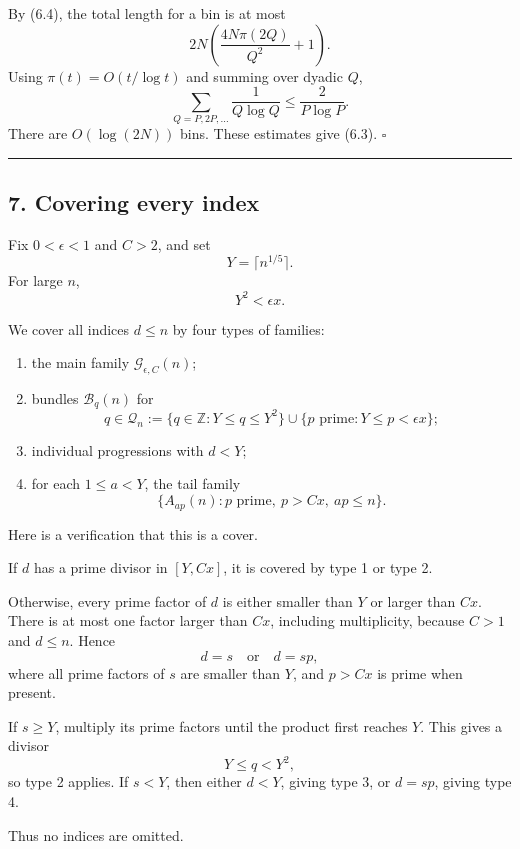 \documentclass[
  11pt,
  a4paper,
]{article}
\providecommand{\tightlist}{%
  \setlength{\itemsep}{0pt}\setlength{\parskip}{0pt}}
\begin{document}
By (6.4), the total length for a bin is at most \[
2N\left(\frac{4N\pi(2Q)}{Q^2}+1\right).
\] Using \(\pi(t)=O(t/\log t)\) and summing over dyadic \(Q\), \[
\sum_{Q=P,2P,\ldots}\frac1{Q\log Q}
\le \frac2{P\log P}.
\] There are \(O(\log(2N))\) bins. These estimates give (6.3).
\(\square\)

\begin{center}\rule{0.5\linewidth}{0.5pt}\end{center}

\subsection{7. Covering every index}\label{covering-every-index}

Fix \(0<\epsilon<1\) and \(C>2\), and set \[
Y=\lceil n^{1/5}\rceil.
\] For large \(n\), \[
Y^2<\epsilon x.
\]

We cover all indices \(d\le n\) by four types of families:

\begin{enumerate}
\def\labelenumi{\arabic{enumi}.}
\tightlist
\item
  the main family \(\mathcal G_{\epsilon,C}(n)\);
\item
  bundles \(\mathcal B_q(n)\) for \[
  q\in\mathcal Q_n:=
  \{q\in\mathbb Z:Y\le q\le Y^2\}
  \cup
  \{p\text{ prime}:Y\le p<\epsilon x\};
  \]
\item
  individual progressions with \(d<Y\);
\item
  for each \(1\le a<Y\), the tail family \[
  \{A_{ap}(n):p\text{ prime},\ p>Cx,\ ap\le n\}.
  \]
\end{enumerate}

Here is a verification that this is a cover.

If \(d\) has a prime divisor in \([Y,Cx]\), it is covered by type 1 or
type 2.

Otherwise, every prime factor of \(d\) is either smaller than \(Y\) or
larger than \(Cx\). There is at most one factor larger than \(Cx\),
including multiplicity, because \(C>1\) and \(d\le n\). Hence \[
d=s\quad\text{or}\quad d=sp,
\] where all prime factors of \(s\) are smaller than \(Y\), and \(p>Cx\)
is prime when present.

If \(s\ge Y\), multiply its prime factors until the product first
reaches \(Y\). This gives a divisor \[
Y\le q<Y^2,
\] so type 2 applies. If \(s<Y\), then either \(d<Y\), giving type 3, or
\(d=sp\), giving type 4.

Thus no indices are omitted.
\end{document}
